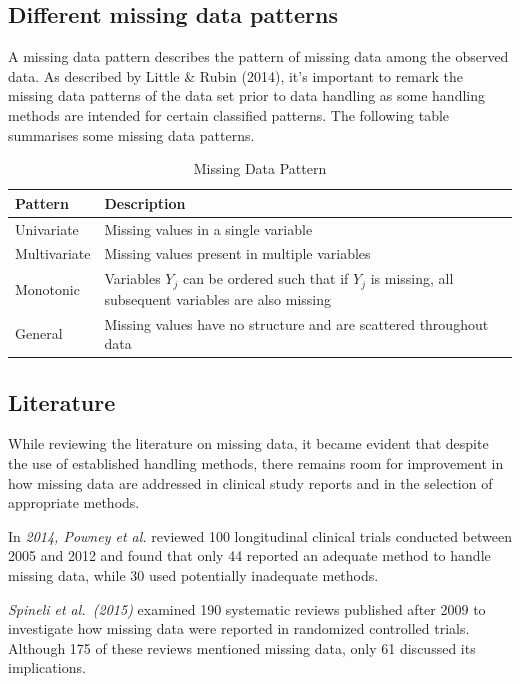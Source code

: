 \documentclass{article}
\begin{document}
\subsection{Different missing data
patterns}\label{different-missing-data-patterns}

A missing data pattern describes the pattern of missing data among the
observed data. As described by Little \& Rubin (2014), it's important to
remark the missing data patterns of the data set prior to data handling
as some handling methods are intended for certain classified patterns.
The following table summarises some missing data patterns.

\begin{table}[H]
\centering
\caption{Missing Data Pattern}
\label{}

\begin{tabular}{ll}
\toprule
Pattern & Description\\
\midrule
Univariate & Missing values in a single variable\\
Multivariate & Missing values present in multiple variables\\
Monotonic & Variables $Y_j$ can be ordered such that if $Y_j$ is missing, all subsequent variables are also missing\\
General & Missing values have no structure and are scattered throughout data\\
\bottomrule
\end{tabular}
\end{table}

\subsection{Literature}\label{literature}

While reviewing the literature on missing data, it became evident that
despite the use of established handling methods, there remains room for
improvement in how missing data are addressed in clinical study reports
and in the selection of appropriate methods.

In \emph{2014, Powney et al.} reviewed 100 longitudinal clinical trials
conducted between 2005 and 2012 and found that only 44 reported an
adequate method to handle missing data, while 30 used potentially
inadequate methods.

\emph{Spineli et al.~(2015)} examined 190 systematic reviews published
after 2009 to investigate how missing data were reported in randomized
controlled trials. Although 175 of these reviews mentioned missing data,
only 61 discussed its implications.
\end{document}

